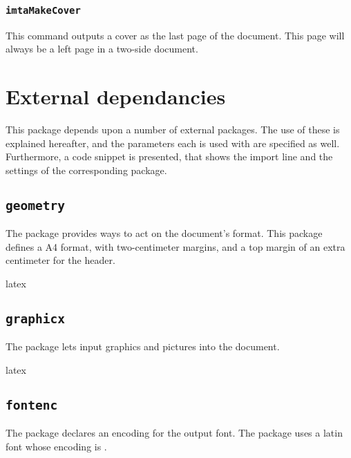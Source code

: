 \documentclass{report}
\begin{document}
\subsubsection{\texttt{imtaMakeCover}}

This command outputs a cover as the last page of the document.
This page will always be a left page in a two-side document.

\section{External dependancies}

This package depends upon a number of external packages.
The use of these is explained hereafter, and the parameters each is used with are specified as well.
Furthermore, a code snippet is presented, that shows the import line and the settings of the corresponding package.

\subsection{\texttt{geometry}}

The  package provides ways to act on the document's format.
This package defines a A4 format, with two-centimeter margins, and a top margin of an extra centimeter for the header.

\begin{imtaCode}{latex}
\RequirePackage[a4paper, margin=2cm, top=3cm]{geometry}
\end{imtaCode}

\subsection{\texttt{graphicx}}

The  package lets input graphics and pictures into the document.

\begin{imtaCode}{latex}
\RequirePackage{graphicx}
\end{imtaCode}

\subsection{\texttt{fontenc}}

The  package declares an encoding for the output font.
The  package uses a latin font whose encoding is .
\end{document}

